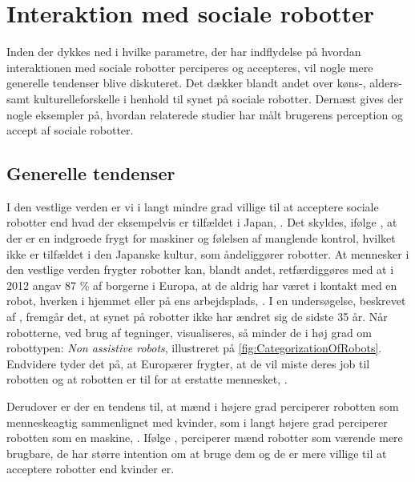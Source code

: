 \section{Interaktion med sociale robotter}
\label{InteraktionSocialeRobotter}
%
Inden der dykkes ned i hvilke parametre, der har indflydelse på hvordan interaktionen med sociale robotter perciperes og accepteres, vil nogle mere generelle tendenser blive diskuteret. Det dækker blandt andet over køns-, alders- samt kulturelleforskelle i henhold til synet på sociale robotter. Dernæst gives der nogle eksempler på, hvordan relaterede studier har målt brugerens perception og accept af sociale robotter.
%
\subsection{Generelle tendenser}
\label{InteraktionSocialeRobotterGenerelleTendenser}
%
I den vestlige verden er vi i langt mindre grad villige til at acceptere sociale robotter end hvad der eksempelvis er tilfældet i Japan, \parencite[s. 28]{PDF:InTheCompanyofRobots}. Det skyldes, ifølge \textcite[s. 28]{PDF:InTheCompanyofRobots}, at der er en indgroede frygt for maskiner og følelsen af manglende kontrol, hvilket ikke er tilfældet i den Japanske kultur, som åndeliggører robotter. At mennesker i den vestlige verden frygter robotter kan, blandt andet, retfærdiggøres med at i 2012 angav 87 \% af borgerne i Europa, at de aldrig har været i kontakt med en robot, hverken i hjemmet eller på ens arbejdsplads, \parencite[s. 40]{PDF:PerceptionAcceptance}. I en undersøgelse, beskrevet af \textcite[s. 41]{PDF:PerceptionAcceptance}, fremgår det, at synet på robotter ikke har ændret sig de sidste 35 år. Når robotterne, ved brug af tegninger, visualiseres, så minder de i høj grad om robottypen: \textit{Non assistive robots}, illustreret på \autoref{fig:CategorizationOfRobots}. Endvidere tyder det på, at Europærer frygter, at de vil miste deres job til robotten og at robotten er til for at erstatte mennesket, \parencite[s. 22]{PDF:RobotShiftFromIPtoSR}.   

Derudover er der en tendens til, at mænd i højere grad perciperer robotten som menneskeagtig sammenlignet med kvinder, som i langt højere grad perciperer robotten som en maskine, \parencite[s. 28]{PDF:InTheCompanyofRobots}. Ifølge \textcite[s. 1479]{PDF:ExploringInfluencingVariable}, perciperer mænd robotter som værende mere brugbare, de har større intention om at bruge dem og de er mere villige til at acceptere robotter end kvinder er.  

